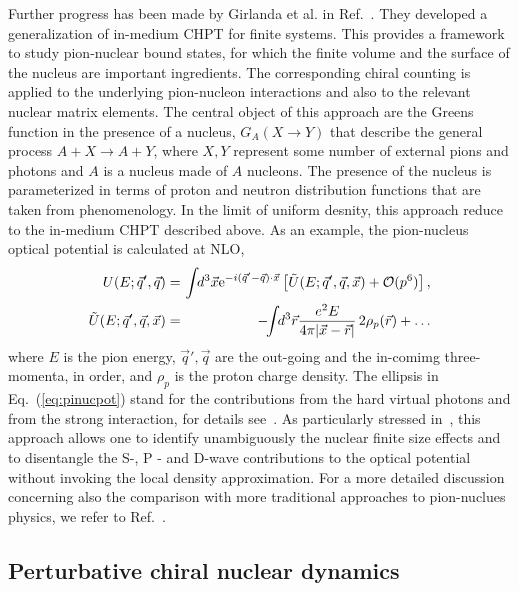 \documentclass[aps,rmp,nofootinbib,twocolumn,floatfix]{revtex4}
\newcommand{\beqa}{\begin{eqnarray}}
\newcommand{\eeqa}{\end{eqnarray}}
\begin{document}
Further progress has been made by Girlanda et al. in 
Ref.~\cite{Girlanda:2003cq}. They developed a generalization of
in-medium CHPT for finite systems. This provides a framework
to study pion-nuclear bound states, for which the finite volume
and the surface of the nucleus are important ingredients. The
corresponding chiral counting is applied to the underlying pion-nucleon
interactions and also to the relevant nuclear matrix elements. The
central object of this approach are the Greens function in the
presence of a nucleus, $G_A(X\to Y)$ that describe the general process
$A + X \to A +Y$, where $X,Y$ represent some number of external pions
and photons and $A$ is a nucleus made of $A$ nucleons. The presence of the 
nucleus is parameterized in terms of proton and neutron distribution functions
that are taken from phenomenology. In the limit of uniform desnity,
this approach reduce to the in-medium CHPT described above. As an
example, the pion-nucleus optical potential  is calculated at NLO,
\beqa\label{eq:pinucpot}
U(E;\vec{q}', \vec{q}) &=& \!\!\!\! \int\!\! d^3\vec{x} 
{\rm e}^{-i(\vec{q}'-\vec{q})\cdot \vec{x}} \left[ \tilde{U}
(E;\vec{q}', \vec{q}, \vec{x}) + {\cal O}(p^6)\right],\nonumber\\
\tilde{U}(E;\vec{q}', \vec{q},\vec{x}) &=& - \!\!\int\!\! d^3\vec{r}
\frac{e^2 E}{4\pi |\vec{x}-\vec{r}|} \, 2\rho_p(\vec{r})
+ \ldots 
\eeqa
where $E$ is the pion energy, $\vec{q}', \vec{q}$ are the out-going and the
in-comimg three-momenta, in order, and $\rho_p$ is the proton charge density. 
The ellipsis in Eq.~(\ref{eq:pinucpot}) stand for the contributions from 
the hard virtual photons and from the strong interaction,
for details see~\cite{Girlanda:2003cq}. As particularly stressed
in~\cite{Girlanda:2004qa}, this approach allows one to identify 
unambiguously the nuclear finite size effects and to disentangle the 
S-, P - and D-wave contributions to the optical potential without invoking 
the local density approximation. For a more detailed discussion concerning
also the comparison with more traditional approaches to pion-nuclues
physics, we refer to Ref.~\cite{Girlanda:2003cq}. 

\subsection{Perturbative chiral nuclear dynamics}
\label{sec:TUMrho}
\end{document}

